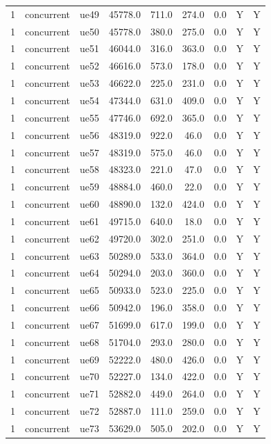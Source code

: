 \begin{table}[ht]
\begin{tabular}{|c|c|c|c|c|c|c|c|c|}
1 & concurrent & ue49 & 45778.0 & 711.0 & 274.0 & 0.0 & Y & Y \\
1 & concurrent & ue50 & 45778.0 & 380.0 & 275.0 & 0.0 & Y & Y \\
1 & concurrent & ue51 & 46044.0 & 316.0 & 363.0 & 0.0 & Y & Y \\
1 & concurrent & ue52 & 46616.0 & 573.0 & 178.0 & 0.0 & Y & Y \\
1 & concurrent & ue53 & 46622.0 & 225.0 & 231.0 & 0.0 & Y & Y \\
1 & concurrent & ue54 & 47344.0 & 631.0 & 409.0 & 0.0 & Y & Y \\
1 & concurrent & ue55 & 47746.0 & 692.0 & 365.0 & 0.0 & Y & Y \\
1 & concurrent & ue56 & 48319.0 & 922.0 & 46.0 & 0.0 & Y & Y \\
1 & concurrent & ue57 & 48319.0 & 575.0 & 46.0 & 0.0 & Y & Y \\
1 & concurrent & ue58 & 48323.0 & 221.0 & 47.0 & 0.0 & Y & Y \\
1 & concurrent & ue59 & 48884.0 & 460.0 & 22.0 & 0.0 & Y & Y \\
1 & concurrent & ue60 & 48890.0 & 132.0 & 424.0 & 0.0 & Y & Y \\
1 & concurrent & ue61 & 49715.0 & 640.0 & 18.0 & 0.0 & Y & Y \\
1 & concurrent & ue62 & 49720.0 & 302.0 & 251.0 & 0.0 & Y & Y \\
1 & concurrent & ue63 & 50289.0 & 533.0 & 364.0 & 0.0 & Y & Y \\
1 & concurrent & ue64 & 50294.0 & 203.0 & 360.0 & 0.0 & Y & Y \\
1 & concurrent & ue65 & 50933.0 & 523.0 & 225.0 & 0.0 & Y & Y \\
1 & concurrent & ue66 & 50942.0 & 196.0 & 358.0 & 0.0 & Y & Y \\
1 & concurrent & ue67 & 51699.0 & 617.0 & 199.0 & 0.0 & Y & Y \\
1 & concurrent & ue68 & 51704.0 & 293.0 & 280.0 & 0.0 & Y & Y \\
1 & concurrent & ue69 & 52222.0 & 480.0 & 426.0 & 0.0 & Y & Y \\
1 & concurrent & ue70 & 52227.0 & 134.0 & 422.0 & 0.0 & Y & Y \\
1 & concurrent & ue71 & 52882.0 & 449.0 & 264.0 & 0.0 & Y & Y \\
1 & concurrent & ue72 & 52887.0 & 111.0 & 259.0 & 0.0 & Y & Y \\
1 & concurrent & ue73 & 53629.0 & 505.0 & 202.0 & 0.0 & Y & Y \\

\end{tabular}
\end{table}
